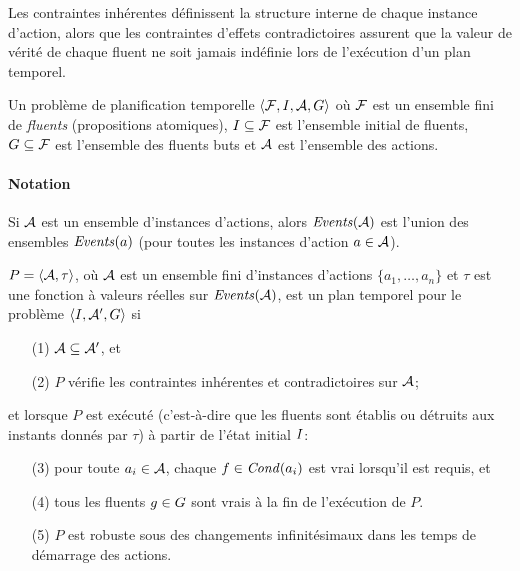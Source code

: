 Les contraintes inhérentes définissent la structure interne de chaque instance d'action, alors que les contraintes d'effets contradictoires assurent que la valeur de vérité de chaque fluent ne soit jamais indéfinie lors de l'exécution d'un plan temporel. %

\begin{definition}
Un problème de planification temporelle $\langle \mathcal{F}, I, \mathcal{A}, G \rangle$ %
où $\mathcal{F}$ est un ensemble fini de \emph{fluents} (propositions atomiques), $I \subseteq \mathcal{F}$ est l'ensemble initial de fluents, $G \subseteq \mathcal{F}$ est l'ensemble des fluents buts et $\mathcal{A}$ est l'ensemble des actions.
\end{definition}
\paragraph*{Notation} Si $\mathcal{A}$ est un ensemble d'instances d'actions, alors $\mathit{Events}(\mathcal{A})$ est l'union des ensembles $\mathit{Events}(a)$ (pour toutes les instances d'action $a\in \mathcal{A}$).

\begin{definition}\label{def:plan-temporel}
$P = \langle \mathcal{A}, \tau \rangle$, où $\mathcal{A}$ est un ensemble fini d'instances d'actions $\{a_1,\ldots, a_n\}$ et $\tau$ est une fonction à valeurs réelles sur $\mathit{Events}(\mathcal{A})$, est un plan temporel pour le problème $\langle I , \mathcal{A}^{\prime}, G \rangle$ si
\begin{enumerate}
\item[(1)] $\mathcal{A} \subseteq \mathcal{A}^{\prime}$, et
\item[(2)] $P$ vérifie les contraintes inhérentes et contradictoires sur $\mathcal{A}$;
\end{enumerate}
et lorsque $P$ est exécuté (c'est-à-dire que les fluents sont établis ou détruits aux instants donnés par $\tau$) à partir de l'état initial $I$:
\begin{enumerate}
\item[(3)] pour toute $a_i \in \mathcal{A}$, chaque $f \in \mathit{Cond}(a_i)$ est vrai lorsqu'il est requis, et
\item[(4)] tous les fluents $g \in G$ sont vrais à la fin de l'exécution de $P$.
\item[(5)] $P$ est robuste sous des changements infinitésimaux dans les temps de démarrage des actions.
\end{enumerate}
\end{definition}

